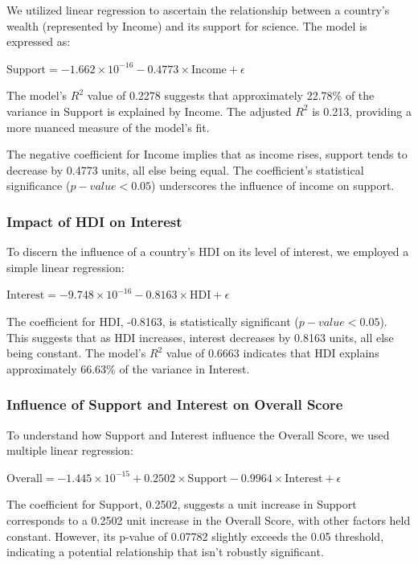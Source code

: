 \documentclass[12pt]{article}
\begin{document}
  We utilized linear regression to ascertain the relationship between a country's wealth (represented by Income) and its support for science. The model is expressed as:

$\text{Support} = -1.662 \times 10^{-16} - 0.4773 \times \text{Income} + \epsilon$

The model's $R^2$ value of 0.2278 suggests that approximately 22.78\% of the variance in Support is explained by Income. The adjusted $R^2$ is 0.213, providing a more nuanced measure of the model's fit.

The negative coefficient for Income implies that as income rises, support tends to decrease by 0.4773 units, all else being equal. The coefficient's statistical significance ($p-value < 0.05$) underscores the influence of income on support.

\subsubsection{Impact of HDI on Interest}
\label{sss.hdivsint}

To discern the influence of a country's HDI on its level of interest, we employed a simple linear regression:

$\text{Interest} = -9.748 \times 10^{-16} - 0.8163 \times \text{HDI} + \epsilon$

The coefficient for HDI, -0.8163, is statistically significant ($p-value < 0.05$). This suggests that as HDI increases, interest decreases by 0.8163 units, all else being constant. The model's $R^2$ value of 0.6663 indicates that HDI explains approximately 66.63\% of the variance in Interest.

\subsubsection{Influence of Support and Interest on Overall Score}
\label{sss.supintvsoverall}

To understand how Support and Interest influence the Overall Score, we used multiple linear regression:

$\text{Overall} = -1.445 \times 10^{-15} + 0.2502 \times \text{Support} - 0.9964 \times \text{Interest} + \epsilon$


The coefficient for Support, 0.2502, suggests a unit increase in Support corresponds to a 0.2502 unit increase in the Overall Score, with other factors held constant. However, its p-value of 0.07782 slightly exceeds the 0.05 threshold, indicating a potential relationship that isn't robustly significant.
\end{document}
